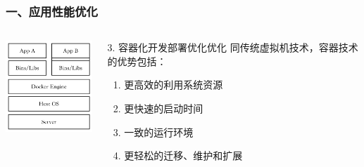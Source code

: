 \documentclass{beamer}
\begin{document}
\begin{frame}
  \frametitle{一、应用性能优化}
  \begin{columns}
    \begin{column}{0.50\textwidth}
      \centering
      \includegraphics[width=4cm]{./img/02/docker2.png}
      \label{fig:docker}
    \end{column}
    \begin{column}{0.50\textwidth}
      \begin{block}{3. 容器化开发部署优化优化}
      同传统虚拟机技术，容器技术的优势包括\cite{chamberlain2014using}：
      \begin{enumerate}
        \item 更高效的利用系统资源
        \item 更快速的启动时间
        \item 一致的运行环境
        \item 更轻松的迁移、维护和扩展
      \end{enumerate}
      \end{block}
    \end{column}
  \end{columns}
  \begin{table}[H]
  \centering
  \begin{minipage}[t]{\linewidth} %
  \centering
  \caption[Docker]{\scriptsize{同传统虚拟机技术对比}}
  \end{minipage}
\end{table}
\end{frame}
\end{document}
